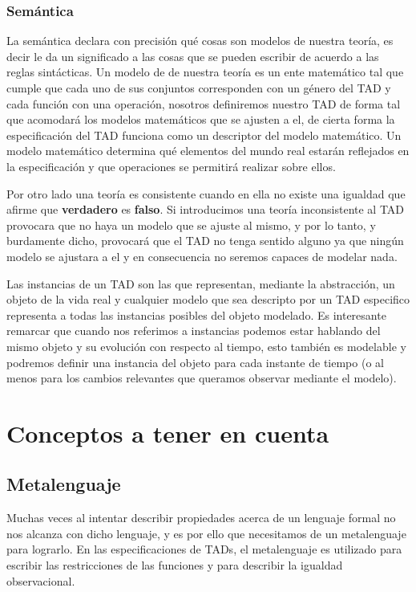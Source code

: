 \documentclass[10pt, a4paper]{report}
\begin{document}
\subsubsection*{Sem\'antica}

La sem\'antica declara con precisi\'on qu\'e cosas son modelos de nuestra teor\'ia, es decir le da un significado a las cosas que se pueden escribir de acuerdo a las reglas sint\'acticas. Un modelo de de nuestra teor\'ia es un ente matem\'atico tal que cumple que cada uno de sus conjuntos corresponden con un g\'enero del TAD y cada funci\'on con una operaci\'on, nosotros definiremos nuestro TAD de forma tal que acomodar\'a los modelos matem\'aticos que se ajusten a el, de cierta forma la especificaci\'on del TAD funciona como un descriptor del modelo matem\'atico. Un modelo matem\'atico determina qu\'e elementos del mundo real estar\'an reflejados en la especificaci\'on y que operaciones se permitir\'a realizar sobre ellos. 

Por otro lado una teor\'ia es consistente cuando en ella no existe una igualdad que afirme que \textbf{verdadero} es \textbf{falso}. Si introducimos una teor\'ia inconsistente al TAD provocara que no haya un modelo que se ajuste al mismo, y por lo tanto, y burdamente dicho, provocar\'a que el TAD no tenga sentido alguno ya que ning\'un modelo se ajustara a el y en consecuencia no seremos capaces de modelar nada.

Las instancias de un TAD son las que representan, mediante la abstracci\'on, un objeto de la vida real y cualquier modelo que sea descripto por un TAD especifico representa a todas las instancias posibles del objeto modelado. Es interesante remarcar que cuando nos referimos a instancias podemos estar hablando del mismo objeto y su evoluci\'on con respecto al tiempo, esto tambi\'en es modelable y podremos definir una instancia del objeto para cada instante de tiempo (o al menos para los cambios relevantes que queramos observar mediante el modelo).

\section{Conceptos a tener en cuenta}
\subsection{Metalenguaje}

Muchas veces al intentar describir propiedades acerca de un lenguaje formal no nos alcanza con dicho lenguaje, y es por ello que necesitamos de un metalenguaje para lograrlo. En las especificaciones de TADs, el metalenguaje es utilizado para escribir las restricciones de las funciones y para describir la igualdad observacional.
\end{document}
